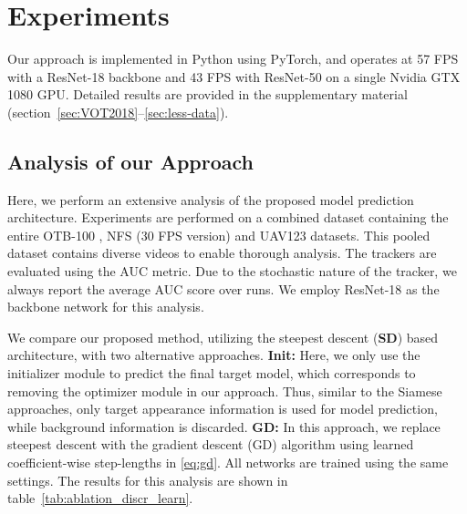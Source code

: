 \documentclass[10pt,twocolumn,letterpaper]{article}
\begin{document}
 \section{Experiments}


Our approach is implemented in Python using PyTorch, and operates at 57 FPS with a ResNet-18 backbone and 43 FPS with ResNet-50 on a single Nvidia GTX 1080 GPU. Detailed results are provided in the supplementary material (section~\ref{sec:VOT2018}--\ref{sec:less-data}).

\subsection{Analysis of our Approach}
\label{sec:exp_baseline}
Here, we perform an extensive analysis of the proposed model prediction architecture. Experiments are performed on a combined dataset containing the entire OTB-100 \cite{OTB2015}, NFS (30 FPS version) \cite{NfS} and UAV123 \cite{UAV123} datasets. This pooled dataset contains  diverse videos to enable thorough analysis. The trackers are evaluated using the AUC \cite{OTB2015} metric. Due to the stochastic nature of the tracker, we always report the average AUC score over  runs. We employ ResNet-18 as the backbone network for this analysis.



\begin{table}[!t]
	\centering\vspace{-1mm}
	\vspace{1mm}\caption{
		Analysis of different model prediction architectures on the combined OTB-100, NFS and UAV123 datasets. The architecture using only the target information for model prediction (\textbf{Init}) achieves an AUC score of . The proposed steepest descent based architecture (\textbf{SD}) provides the best results, outperforming the gradient descent method  (\textbf{GD}) by over  AUC score.}
	\label{tab:ablation_discr_learn}\vspace{-2mm}
\end{table}

We compare our proposed method, utilizing the steepest descent (\textbf{SD}) based architecture, with two alternative approaches. \textbf{Init:} Here, we only use the initializer module to predict the final target model, which corresponds to removing the optimizer module in our approach. Thus, similar to the Siamese approaches, only target appearance information is used for model prediction, while background information is discarded. \textbf{GD:} In this approach, we replace steepest descent with the gradient descent (GD) algorithm using learned coefficient-wise step-lengths  in \eqref{eq:gd}. All networks are trained using the same settings. The results for this analysis are shown in table~\ref{tab:ablation_discr_learn}. 
\end{document}
